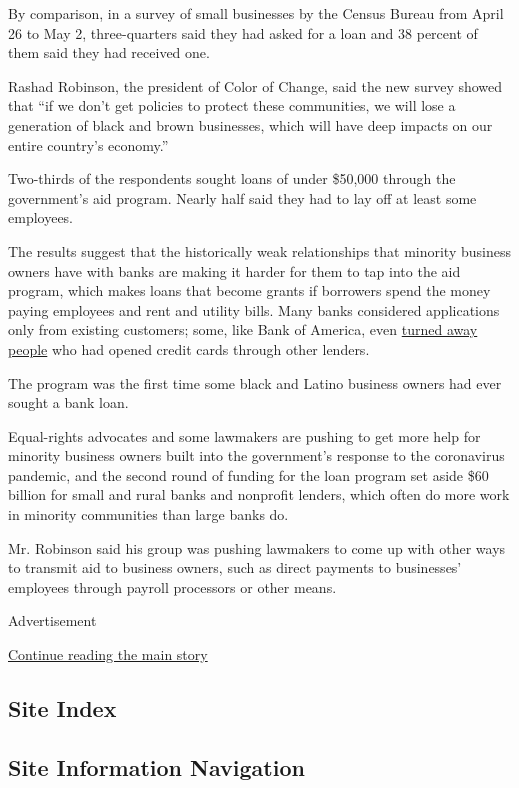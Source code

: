 By comparison, in a survey of small businesses by the Census Bureau from
April 26 to May 2, three-quarters said they had asked for a loan and 38
percent of them said they had received one.

Rashad Robinson, the president of Color of Change, said the new survey
showed that ``if we don't get policies to protect these communities, we
will lose a generation of black and brown businesses, which will have
deep impacts on our entire country's economy.''

Two-thirds of the respondents sought loans of under \$50,000 through the
government's aid program. Nearly half said they had to lay off at least
some employees.

The results suggest that the historically weak relationships that
minority business owners have with banks are making it harder for them
to tap into the aid program, which makes loans that become grants if
borrowers spend the money paying employees and rent and utility bills.
Many banks considered applications only from existing customers; some,
like Bank of America, even
\href{https://www.nytimes3xbfgragh.onion/2020/04/10/business/minority-business-coronavirus-loans.html}{turned
away people} who had opened credit cards through other lenders.

The program was the first time some black and Latino business owners had
ever sought a bank loan.

Equal-rights advocates and some lawmakers are pushing to get more help
for minority business owners built into the government's response to the
coronavirus pandemic, and the second round of funding for the loan
program set aside \$60 billion for small and rural banks and nonprofit
lenders, which often do more work in minority communities than large
banks do.

Mr. Robinson said his group was pushing lawmakers to come up with other
ways to transmit aid to business owners, such as direct payments to
businesses' employees through payroll processors or other means.

Advertisement

\protect\hyperlink{after-bottom}{Continue reading the main story}

\hypertarget{site-index}{%
\subsection{Site Index}\label{site-index}}

\hypertarget{site-information-navigation}{%
\subsection{Site Information
Navigation}\label{site-information-navigation}}

